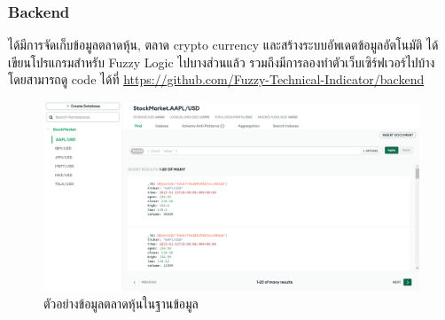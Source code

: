 \subsubsection{Backend}
ได้มีการจัดเก็บข้อมูลตลาดหุ้น, ตลาด crypto currency และสร้างระบบอัพเดตข้อมูลอัตโนมัติ ได้เขียนโปรแกรมสำหรับ Fuzzy Logic ไปบางส่วนแล้ว
รวมถึงมีการลองทำตัวเว็บเซิร์ฟเวอร์ไปบ้าง โดยสามารถดู code ได้ที่ \url{https://github.com/Fuzzy-Technical-Indicator/backend}

\begin{figure}[ht]
    \centering
    \includegraphics[width=\textwidth]{images/db_example.png}
    \caption{ตัวอย่างข้อมูลตลาดหุ้นในฐานข้อมูล}
\end{figure}
\pagebreak




